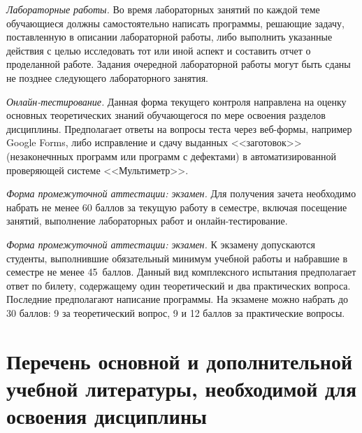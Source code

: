 \documentclass[a4paper,12pt]{article}
\begin{document}
\textit{Лабораторные работы.}\/ Во время лабораторных занятий по каждой теме
обучающиеся должны самостоятельно написать программы, решающие задачу, поставленную в
описании лабораторной работы, либо выполнить указанные действия с целью исследовать
тот или иной аспект и составить отчет о проделанной работе. Задания очередной
лабораторной работы могут быть сданы не позднее следующего лабораторного занятия.
\par
\par
\textit{Онлайн-тестирование.}\/ Данная форма текущего контроля направлена на оценку основных
теоретических знаний обучающегося по мере освоения разделов дисциплины. Предполагает
ответы на вопросы теста через веб-формы, например Google Forms, либо
исправление и сдачу выданных <<заготовок>> (незаконечнных программ или
программ с дефектами) в автоматизированной проверяющей системе <<Мультиметр>>.
\par
\textit{Форма промежуточной аттестации: экзамен.}\/ Для получения зачета
необходимо набрать не менее 60 баллов за текущую работу в семестре, включая
посещение занятий, выполнение лабораторных работ и онлайн-тестирование.
\par
\textit{Форма промежуточной аттестации: экзамен.}\/ К экзамену допускаются студенты,
выполнившие обязательный минимум учебной работы и набравшие в семестре не менее 45~баллов.
Данный вид комплексного испытания предполагает ответ по билету, содержащему один
теоретический и два практических вопроса. Последние предполагают написание программы.
На экзамене можно набрать до 30 баллов: 9 за теоретический вопрос, 9 и 12 баллов за
практические вопросы.



\newpage
\section{Перечень основной и дополнительной учебной литературы, необходимой для освоения дисциплины}
\end{document}
